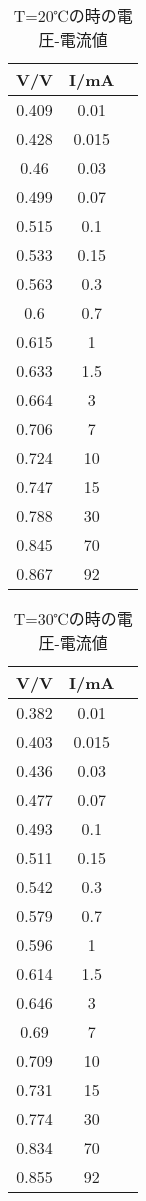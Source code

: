 \documentclass[11pt,a4j]{jsarticle}
\begin{document}
 \begin{table}[htb]
  \begin{center}
    \caption{T=20℃の時の電圧-電流値}
    \begin{tabular}{ccc} \toprule
V/V	&	I/mA\\ \midrule
0.409	&	0.01\\
0.428	&	0.015\\
0.46	&	0.03\\
0.499	&	0.07\\
0.515	&	0.1\\
0.533	&	0.15\\
0.563	&	0.3\\
0.6	&	0.7\\
0.615	&	1\\
0.633	&	1.5\\
0.664	&	3\\
0.706	&	7\\
0.724	&	10\\
0.747	&	15\\
0.788	&	30\\
0.845	&	70\\
0.867	&	92\\ \bottomrule
    \end{tabular}
    \label{tab:price}
  \end{center}
\end{table}
 
 \begin{table}[htb]
  \begin{center}
    \caption{T=30℃の時の電圧-電流値}
    \begin{tabular}{ccc} \toprule
V/V	&	I/mA\\ \midrule
0.382	&	0.01\\
0.403	&	0.015\\
0.436	&	0.03\\
0.477	&	0.07\\
0.493	&	0.1\\
0.511	&	0.15\\
0.542	&	0.3\\
0.579	&	0.7\\
0.596	&	1\\
0.614	&	1.5\\
0.646	&	3\\
0.69	&	7\\
0.709	&	10\\
0.731	&	15\\
0.774	&	30\\
0.834	&	70\\
0.855	&	92\\ \bottomrule
    \end{tabular}
    \label{tab:price}
  \end{center}
\end{table}
\end{document}
